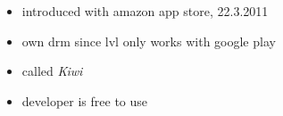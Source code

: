 \begin{itemize}
  \item introduced with amazon app store, 22.3.2011
  \item own drm since lvl only works with google play
  \item called \textit{Kiwi}
  \item developer is free to use
\end{itemize}
